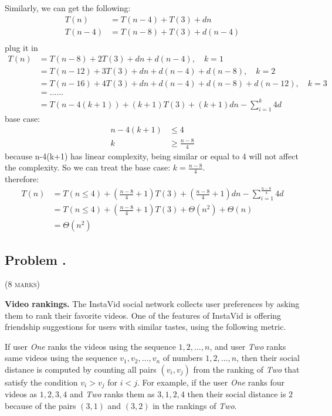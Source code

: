 \documentclass[12pt]{article}
\newcounter{ProblemNum}
\renewcommand{\theProblemNum}{\arabic{ProblemNum}}
\newcommand*{\anyproblem}[1]{\newpage\subsection*{#1}}
\newcommand*{\problem}[1]{\stepcounter{ProblemNum} %
\anyproblem{Problem \theProblemNum. \; #1}}
\begin{document}
\newpage
{}
Similarly, we can get the following:
\begin{align*}
    T(n)&=T(n-4)+T(3)+dn\\
    T(n-4)&=T(n-8)+T(3)+d(n-4)\\
\end{align*}
plug it in
\begin{align*}
    T(n) &= T(n-8)+2T(3)+dn+d(n-4),\quad k =1\\
     &= T(n-12)+3T(3)+dn+d(n-4)+d(n-8),\quad k=2\\
     &= T(n-16)+4T(3)+dn+d(n-4)+d(n-8)+d(n-12),\quad k=3\\
     &=......\\
    &= T(n-4(k+1))+(k+1)T(3) +(k+1)dn -\sum_{i=1}^{k}4d
\end{align*}
base case:
\begin{align*}
n-4(k+1) &\le4\\
k&\ge\frac{n-8}{4}
\end{align*}
because n-4(k+1) has linear complexity, being similar or equal to 4 will not affect the complexity. So we can treat the base case: $k=\frac{n-8}{4}$.\\
therefore:
\begin{align*}
T(n)&= T(n\le 4)+(\frac{n-8}{4}+1)T(3) +(\frac{n-8}{4}+1)dn -\sum_{i=1}^{\frac {n-8}{4}}4d\\
&=T(n\le 4)+(\frac{n-8}{4}+1)T(3) +\Theta(n^{2}) +\Theta(n)\\
&=\Theta(n^{2})
\end{align*}
\newpage 






\problem{}
\textsc{(8 marks)} 

\textbf{Video rankings.} The InstaVid social network collects user preferences by asking them to rank their favorite videos. One of the features of InstaVid is offering friendship suggestions for users with similar tastes, using the following metric.

If user \emph{One} ranks the videos using the sequence $1,2,\dots,n$, and user \emph{Two} ranks same videos using the sequence $v_1,v_2,\dots,v_n$ of numbers $1,2,\dots,n$, then their social distance is computed by counting all pairs $(v_i,v_j)$ from the ranking of \emph{Two} that satisfy the condition $v_i>v_j$  for $i<j$. For example, if the user \emph{One} ranks four videos as $1,2,3,4$ and \emph{Two} ranks them as $3,1,2,4$ then 
their social distance is $2$ because of the pairs $(3,1)$ and $(3,2)$ in the rankings of \emph{Two}.
\end{document}
